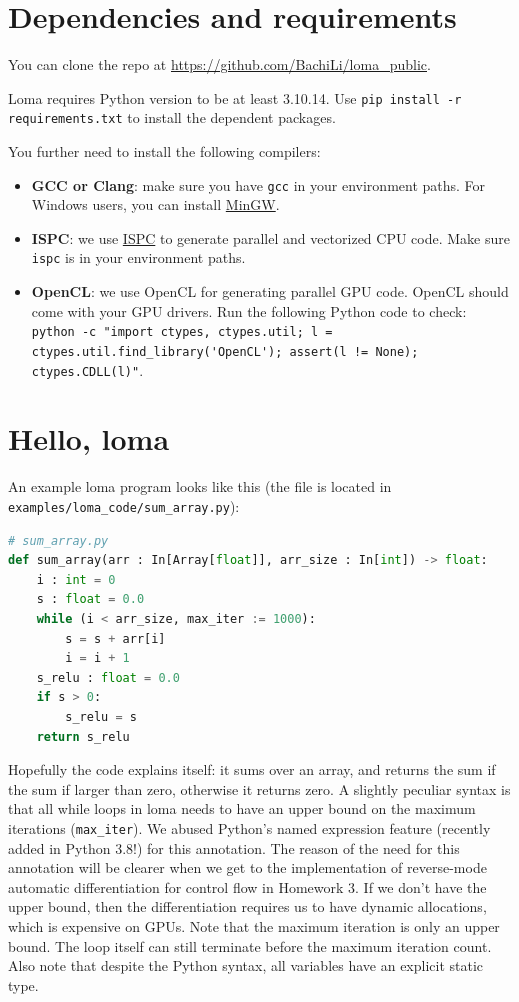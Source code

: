 \section{Dependencies and requirements}

You can clone the repo at \url{https://github.com/BachiLi/loma_public}.

Loma requires Python version to be at least 3.10.14. 
Use \lstinline{pip install -r requirements.txt} to install the dependent packages.

You further need to install the following compilers:
\begin{itemize}
    \item \textbf{GCC or Clang}: make sure you have \lstinline{gcc} in your environment paths. For Windows users, you can install \href{https://www.mingw-w64.org/}{MinGW}.
    \item \textbf{ISPC}: we use \href{https://ispc.github.io/}{ISPC} to generate parallel and vectorized CPU code. Make sure \lstinline{ispc} is in your environment paths.
    \item \textbf{OpenCL}: we use OpenCL for generating parallel GPU code. OpenCL should come with your GPU drivers. Run the following Python code to check: \lstinline{python -c "import ctypes, ctypes.util; l = ctypes.util.find_library('OpenCL'); assert(l != None); ctypes.CDLL(l)"}.
\end{itemize}

\section{Hello, loma}

An example loma program looks like this (the file is located in \lstinline{examples/loma_code/sum_array.py}):
\begin{lstlisting}[language=python]
# sum_array.py
def sum_array(arr : In[Array[float]], arr_size : In[int]) -> float:
    i : int = 0
    s : float = 0.0
    while (i < arr_size, max_iter := 1000):
        s = s + arr[i]
        i = i + 1
    s_relu : float = 0.0
    if s > 0:
        s_relu = s
    return s_relu
\end{lstlisting}
Hopefully the code explains itself: it sums over an array, and returns the sum if the sum if larger than zero, otherwise it returns zero. A slightly peculiar syntax is that all while loops in loma needs to have an upper bound on the maximum iterations (\lstinline{max_iter}). We abused Python's named expression feature (recently added in Python 3.8!) for this annotation. The reason of the need for this annotation will be clearer when we get to the implementation of reverse-mode automatic differentiation for control flow in Homework 3. If we don't have the upper bound, then the differentiation requires us to have dynamic allocations, which is expensive on GPUs. Note that the maximum iteration is only an upper bound. The loop itself can still terminate before the maximum iteration count. Also note that despite the Python syntax, all variables have an explicit static type.

